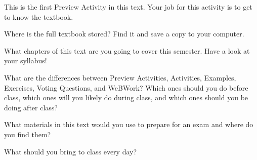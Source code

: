 \begin{pa} \label{PA:0.1}
    This is the first Preview Activity in this text.  Your job for this activity is to get
    to know the textbook.
    \ba
    \item Where is the full textbook stored?  Find it and save a copy to your computer.
    \item What chapters of this text are you going to cover this semester.  Have a look at
        your syllabus!
    \item What are the differences between Preview Activities, Activities, Examples,
        Exercises, Voting Questions, and WeBWork?  Which ones should you do before class,
        which ones will you likely do during class, and which ones should you be doing
        after class?
    \item What materials in this text would you use to prepare for an exam and where do
        you find them?
    \item What should you bring to class every day?
    \ea
\end{pa} \afterpa
